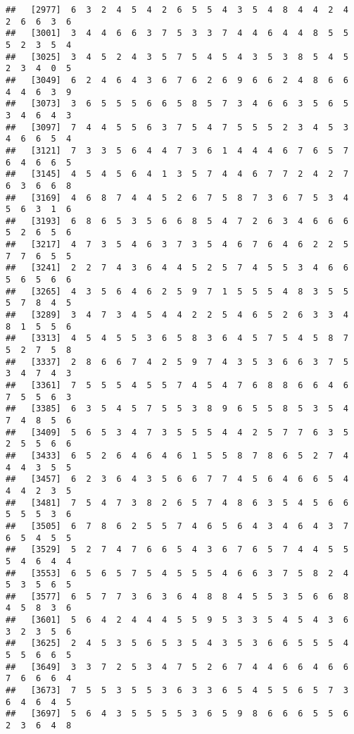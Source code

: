 \documentclass[
]{book}
\begin{document}
\begin{verbatim}
##   [2977]  6  3  2  4  5  4  2  6  5  5  4  3  5  4  8  4  4  2  4  2  6  6  3  6
##   [3001]  3  4  4  6  6  3  7  5  3  3  7  4  4  6  4  4  8  5  5  5  2  3  5  4
##   [3025]  3  4  5  2  4  3  5  7  5  4  5  4  3  5  3  8  5  4  5  2  3  4  0  5
##   [3049]  6  2  4  6  4  3  6  7  6  2  6  9  6  6  2  4  8  6  6  4  4  6  3  9
##   [3073]  3  6  5  5  5  6  6  5  8  5  7  3  4  6  6  3  5  6  5  3  4  6  4  3
##   [3097]  7  4  4  5  5  6  3  7  5  4  7  5  5  5  2  3  4  5  3  4  6  6  5  4
##   [3121]  7  3  3  5  6  4  4  7  3  6  1  4  4  4  6  7  6  5  7  6  4  6  6  5
##   [3145]  4  5  4  5  6  4  1  3  5  7  4  4  6  7  7  2  4  2  7  6  3  6  6  8
##   [3169]  4  6  8  7  4  4  5  2  6  7  5  8  7  3  6  7  5  3  4  5  6  3  1  6
##   [3193]  6  8  6  5  3  5  6  6  8  5  4  7  2  6  3  4  6  6  6  5  2  6  5  6
##   [3217]  4  7  3  5  4  6  3  7  3  5  4  6  7  6  4  6  2  2  5  7  7  6  5  5
##   [3241]  2  2  7  4  3  6  4  4  5  2  5  7  4  5  5  3  4  6  6  5  6  5  6  6
##   [3265]  4  3  5  6  4  6  2  5  9  7  1  5  5  5  4  8  3  5  5  5  7  8  4  5
##   [3289]  3  4  7  3  4  5  4  4  2  2  5  4  6  5  2  6  3  3  4  8  1  5  5  6
##   [3313]  4  5  4  5  5  3  6  5  8  3  6  4  5  7  5  4  5  8  7  5  2  7  5  8
##   [3337]  2  8  6  6  7  4  2  5  9  7  4  3  5  3  6  6  3  7  5  3  4  7  4  3
##   [3361]  7  5  5  5  4  5  5  7  4  5  4  7  6  8  8  6  6  4  6  7  5  5  6  3
##   [3385]  6  3  5  4  5  7  5  5  3  8  9  6  5  5  8  5  3  5  4  7  4  8  5  6
##   [3409]  5  6  5  3  4  7  3  5  5  5  4  4  2  5  7  7  6  3  5  2  5  5  6  6
##   [3433]  6  5  2  6  4  6  4  6  1  5  5  8  7  8  6  5  2  7  4  4  4  3  5  5
##   [3457]  6  2  3  6  4  3  5  6  6  7  7  4  5  6  4  6  6  5  4  4  4  2  3  5
##   [3481]  7  5  4  7  3  8  2  6  5  7  4  8  6  3  5  4  5  6  6  5  5  5  3  6
##   [3505]  6  7  8  6  2  5  5  7  4  6  5  6  4  3  4  6  4  3  7  6  5  4  5  5
##   [3529]  5  2  7  4  7  6  6  5  4  3  6  7  6  5  7  4  4  5  5  5  4  6  4  4
##   [3553]  6  5  6  5  7  5  4  5  5  5  4  6  6  3  7  5  8  2  4  5  3  5  6  5
##   [3577]  6  5  7  7  3  6  3  6  4  8  8  4  5  5  3  5  6  6  8  4  5  8  3  6
##   [3601]  5  6  4  2  4  4  4  5  5  9  5  3  3  5  4  5  4  3  6  3  2  3  5  6
##   [3625]  2  4  5  3  5  6  5  3  5  4  3  5  3  6  6  5  5  5  4  5  5  6  6  5
##   [3649]  3  3  7  2  5  3  4  7  5  2  6  7  4  4  6  6  4  6  6  7  6  6  6  4
##   [3673]  7  5  5  3  5  5  3  6  3  3  6  5  4  5  5  6  5  7  3  6  4  6  4  5
##   [3697]  5  6  4  3  5  5  5  5  3  6  5  9  8  6  6  6  5  5  6  2  3  6  4  8

\end{verbatim}
\end{document}
